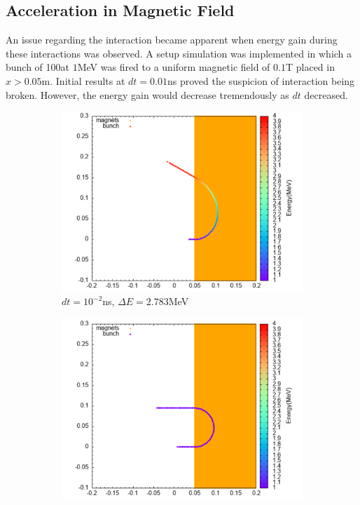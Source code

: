 \documentclass[a4paper,oneside,12pt]{report}
\numberwithin{equation}{chapter}
\begin{document}
\subsection{Acceleration in Magnetic Field}
An issue regarding the \eB interaction became apparent when energy gain during these interactions was observed.
A setup simulation was implemented in which a bunch of 100\e at $1$MeV was fired to a uniform magnetic field of $0.1$T placed in $x>0.05$m.
Initial results at $dt=0.01$ns proved the suspicion of \eB interaction being broken. However, the energy gain would decrease tremendously as $dt$ decreased.


\begin{figure}[H]
    \captionsetup[subfigure]{justification=centering}
    \captionsetup{justification=centering}
    \centering
    \begin{subfigure}{0.8\textwidth}
        \centering
        \includegraphics[width=\linewidth]{./figures/rhodoSim/mag_lf_001dt.png}
        \caption*{$dt=10^{-2}$ns, $\Delta E=2.783$MeV}
    \end{subfigure}
    \begin{subfigure}{0.8\textwidth}
        \centering
        \includegraphics[width=\linewidth]{./figures/rhodoSim/mag_lf_00001dt.png}

\end{subfigure}
\end{figure}
\end{document}
